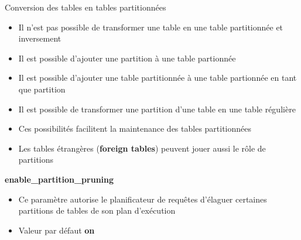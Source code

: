 
\begin{frame}[fragile]{Conversion des tables en tables partitionnées}

   \begin{itemize}
      \item Il n'est pas possible de transformer une table en une table partitionnée et inversement
      \item Il est possible d'ajouter une partition à une table partionnée
      \item Il est possible d'ajouter une table partitionnée à une table partionnée en tant que partition
      \item Il est possible de transformer une partition d'une table en une table régulière
      \item Ces possibilités facilitent la maintenance des tables partitionnées
      \item Les tables étrangères (\textbf{foreign tables}) peuvent jouer aussi le rôle de partitions
   \end{itemize}

\begin{toile}
\end{toile}

\end{frame}


\begin{frame}[fragile]{\textbf{enable\_partition\_pruning}}

   \begin{itemize}
      \item Ce paramètre autorise le planificateur de requêtes d'élaguer certaines partitions de tables de son plan d'exécution
      \item Valeur par défaut \textbf{on}
   \end{itemize}

\begin{toile}
\end{toile}

\end{frame}

